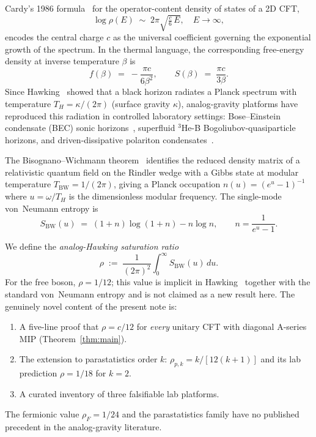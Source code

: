 \documentclass[12pt]{article}
\begin{document}
Cardy's 1986 formula~\cite{Cardy1986} for the operator-content density
of states of a 2D CFT,
\begin{equation}
  \log\rho(E) \;\sim\; 2\pi\sqrt{\tfrac{c}{6}\,E},
  \quad E\to\infty,
\label{eq:cardy-dos}
\end{equation}
encodes the central charge $c$ as the universal coefficient governing
the exponential growth of the spectrum.  In the thermal language,
the corresponding free-energy density at inverse temperature $\beta$ is
\begin{equation}
  f(\beta) \;=\; -\frac{\pi c}{6\beta^2},
  \qquad
  S(\beta) \;=\; \frac{\pi c}{3\beta}.
\label{eq:cardy-S}
\end{equation}
Since Hawking~\cite{Hawking1975} showed that a black horizon radiates a
Planck spectrum with temperature $T_H = \kappa/(2\pi)$ (surface gravity
$\kappa$), analog-gravity platforms have reproduced this radiation in
controlled laboratory settings: Bose--Einstein condensate (BEC) sonic
horizons~\cite{Steinhauer2016,Steinhauer2019,Kolobov2021,Steinhauer2022},
superfluid ${}^3$He-B Bogoliubov-quasiparticle horizons, and
driven-dissipative polariton condensates~\cite{SolnyshkovFlayac2011,Solnyshkov2019}.

The Bisognano--Wichmann theorem~\cite{BisognanoWichmann1976} identifies
the reduced density matrix of a relativistic quantum field on the
Rindler wedge with a Gibbs state at modular temperature
$T_{\mathrm{BW}} = 1/(2\pi)$, giving a Planck occupation
$n(u) = (e^u - 1)^{-1}$ where $u = \omega/T_H$ is the dimensionless
modular frequency.  The single-mode von~Neumann entropy is
\begin{equation}
  S_{\mathrm{BW}}(u) \;=\; (1+n)\log(1+n) - n\log n,
  \qquad n = \frac{1}{e^u - 1}.
\label{eq:S-BW}
\end{equation}

We define the \emph{analog-Hawking saturation ratio}
\begin{equation}
  \rho \;:=\; \frac{1}{(2\pi)^2}\int_0^\infty S_{\mathrm{BW}}(u)\,du.
\label{eq:rho-def}
\end{equation}
For the free boson, $\rho = 1/12$; this value is implicit in
Hawking~\cite{Hawking1975} together with the standard von~Neumann
entropy and is not claimed as a new result here.  The genuinely novel
content of the present note is:
\begin{enumerate}
\item[(a)] A five-line proof that $\rho = c/12$ for \emph{every}
           unitary CFT with diagonal A-series MIP (Theorem~\ref{thm:main}).
\item[(b)] The extension to parastatistics order $k$:
           $\rho_{p,k} = k/[12(k+1)]$ and its lab prediction $\rho=1/18$
           for $k=2$.
\item[(c)] A curated inventory of three falsifiable lab platforms.
\end{enumerate}
The fermionic value $\rho_F = 1/24$ and the parastatistics family have
no published precedent in the analog-gravity literature.
\end{document}
